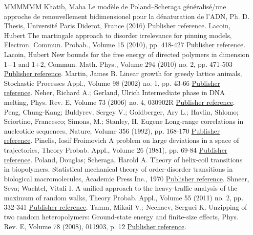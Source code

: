 \begin{thebibliography}{MMMMMM}
 Khatib, Maha Le modèle de Poland–Scheraga généralisé/une approche de renouvellement bidimensionel pour la dénaturation de l’ADN, Ph. D. Thesis, Université Paris Diderot, France (2016) \href{https://ahl.centre-mersenne.org/item/AHL_2020__3__299_0/#cf:Khatib}{Publisher reference}.
 Lacoin, Hubert The martingale approach to disorder irrelevance for pinning models, Electron. Commun. Probab., Volume 15 (2010), pp. 418-427 \href{https://ahl.centre-mersenne.org/item/AHL_2020__3__299_0/#cf:Lac}{Publisher reference}.
 Lacoin, Hubert New bounds for the free energy of directed polymers in dimension 1+1 and 1+2, Commun. Math. Phys., Volume 294 (2010) no. 2, pp. 471-503 \href{https://ahl.centre-mersenne.org/item/AHL_2020__3__299_0/#cf:La10}{Publisher reference}.
 Martin, James B. Linear growth for greedy lattice animals, Stochastic Processes Appl., Volume 98 (2002) no. 1, pp. 43-66 \href{https://ahl.centre-mersenne.org/item/AHL_2020__3__299_0/#cf:Martin02}{Publisher reference}.
 Neher, Richard A.; Gerland, Ulrich Intermediate phase in DNA melting, Phys. Rev. E, Volume 73 (2006) no. 4, 030902R \href{https://ahl.centre-mersenne.org/item/AHL_2020__3__299_0/#cf:NG06}{Publisher reference}.
 Peng, Chung-Kang; Buldyrev, Sergey V.; Goldberger, Ary L.; Havlin, Shlomo; Sciortino, Francesco; Simons, M.; Stanley, H. Eugene Long-range correlations in nucleotide sequences, Nature, Volume 356 (1992), pp. 168-170 \href{https://ahl.centre-mersenne.org/item/AHL_2020__3__299_0/#cf:Peng}{Publisher reference}.
 Pinelis, Iosif Froimovich A problem on large deviations in a space of trajectories, Theory Probab. Appl., Volume 26 (1981), pp. 69-84 \href{https://ahl.centre-mersenne.org/item/AHL_2020__3__299_0/#cf:Pi81}{Publisher reference}.
 Poland, Douglas; Scheraga, Harold A. Theory of helix-coil transitions in biopolymers. Statistical mechanical theory of order-disorder transitions in biological macromolecules, Academic Press Inc., 1970 \href{https://ahl.centre-mersenne.org/item/AHL_2020__3__299_0/#cf:PSbook}{Publisher reference}.
 Shneer, Seva; Wachtel, Vitali I. A unified approach to the heavy-traffic analysis of the maximum of random walks, Theory Probab. Appl., Volume 55 (2011) no. 2, pp. 332-341 \href{https://ahl.centre-mersenne.org/item/AHL_2020__3__299_0/#cf:SW11}{Publisher reference}.
 Tamm, Mikail V.; Nechaev, Serguei K. Unzipping of two random heteropolymers: Ground-state energy and finite-size effects, Phys. Rev. E, Volume 78 (2008), 011903, p. 12 \href{https://ahl.centre-mersenne.org/item/AHL_2020__3__299_0/#cf:TN08}{Publisher reference}.

\end{thebibliography}
